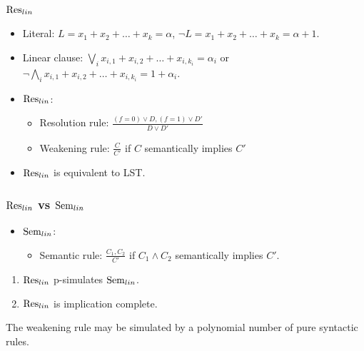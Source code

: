 \begin{frame}
    \frametitle{$\mathrm{Res}_{lin}$}

    \begin{itemize}
		\item Literal: $L = x_{1} + x_{2} + \dots + x_{k} = \alpha$,
    		$\lnot L = x_{1} + x_{2} + \dots + x_{k} = \alpha + 1$.
		\item Linear clause: $\bigvee\limits_i x_{i, 1} + x_{i, 2} + \dots + x_{i, k_i} =
		    \alpha_i$ or $\lnot \bigwedge\limits_i x_{i, 1} + x_{i, 2} + \dots + x_{i, k_i} =
            1 + \alpha_i$.
        \pause
		\item $\mathrm{Res}_{lin}$:
			\begin{itemize}
				\item Resolution rule: $\frac{(f = 0) \lor D, (f = 1) \lor D'}
            		{D \lor D'}$ 
				\item Weakening rule: $\frac{C}{C'}$ if $C$ semantically implies $C'$
			\end{itemize}
        \pause
		\item {} $\mathrm{Res}_{lin}$ is equivalent to LST.
	\end{itemize}
	\scalebox{0.8}{}
\end{frame}



\begin{frame}
    \frametitle{$\mathrm{Res}_{lin}$ vs $\mathrm{Sem}_{lin}$}

    \begin{itemize}
		\item $\mathrm{Sem}_{lin}$:
			\begin{itemize}
				\item Semantic rule: $\frac{C_1, C_2}{C'}$ if $C_1 \land C_2$
		            semantically implies $C'$.
			\end{itemize}
	\end{itemize}

	\pause
    \begin{theorem}
        \begin{enumerate}
            \item $\mathrm{Res}_{lin}$ p-simulates $\mathrm{Sem}_{lin}$.
        	\pause
        	\item $\mathrm{Res}_{lin}$ is implication complete.
        \end{enumerate}
    \end{theorem}

    \pause

    The weakening rule may be simulated by a polynomial number of pure syntactic rules.
\end{frame}




